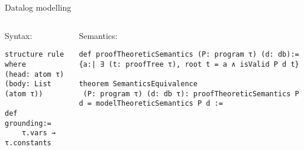 \documentclass[aspectratio=169]{beamer}
\begin{document}
    \begin{frame}[fragile]{Datalog modelling}
        \begin{columns}
            \begin{column}{0.4\textwidth}
                Syntax:

                \begin{lstlisting}
structure rule where
(head: atom τ)
(body: List (atom τ))

def grounding:= 
    τ.vars → τ.constants

                \end{lstlisting}
                
            \end{column}
            \begin{column}{0.5\textwidth}
                Semantics:

                \begin{lstlisting}[basicstyle=\small\ttfamily]
def proofTheoreticSemantics (P: program τ) (d: db):= 
{a:| ∃ (t: proofTree τ), root t = a ∧ isValid P d t}

theorem SemanticsEquivalence 
 (P: program τ) (d: db τ): proofTheoreticSemantics P d = modelTheoreticSemantics P d :=


                \end{lstlisting}
                
            \end{column}
        \end{columns}

    \end{frame}
\end{document}
